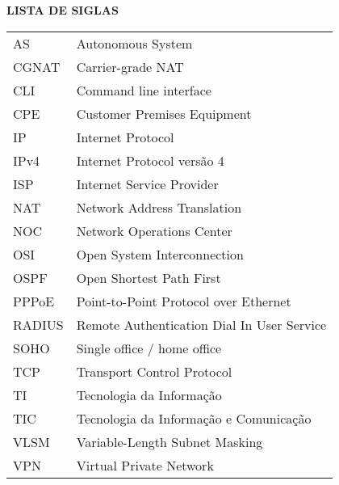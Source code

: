 \begin{center}
  \normalsize{\textbf{LISTA DE SIGLAS}}
\end{center}

\vspace{1mm}

\begin{center}
  \begin{tabular}{ m{3cm} m{10cm} }
    AS & Autonomous System \\
    CGNAT & Carrier-grade NAT \\
    CLI & Command line interface \\
    CPE & Customer Premises Equipment \\
    IP & Internet Protocol \\ 
    IPv4 & Internet Protocol versão 4 \\ 
    ISP & Internet Service Provider \\ 
    NAT & Network Address Translation \\
    NOC & Network Operations Center \\ 
    OSI & Open System Interconnection \\
    OSPF & Open Shortest Path First \\
    PPPoE & Point-to-Point Protocol over Ethernet \\
    RADIUS & Remote Authentication Dial In User Service \\
    SOHO & Single office / home office \\
    TCP & Transport Control Protocol \\ 
    TI & Tecnologia da Informação \\ 
    TIC & Tecnologia da Informação e Comunicação \\ 
    VLSM & Variable-Length Subnet Masking \\ 
    VPN & Virtual Private Network \\ 
  \end{tabular}
\end{center}
